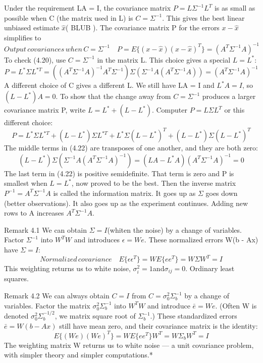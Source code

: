 	Under the requirement LA = I, the covariance matrix $P=L\Sigma^{-1}L^T$ is as small as
	possible when C (the matrix used in L) is $C=\Sigma^{-1}$. This gives the best linear unbiased
	estimate $\hat{x}$( BLUB ). The covariance matrix P for the errors $x-\hat{x}$ simplifies to
	\begin{equation}
	Output\, covariances\, when\, C=\Sigma^{-1} \quad
	P=E\{(x-\hat{x})(x-\hat{x})^T\}=(A^T\Sigma^{-1}A)^{-1}
	\end{equation}
	To check (4.20), use $C=\Sigma^{-1}$ in the matrix L. This choice gives a special $L=L^*$:
	\begin{equation}
	P=L^*\Sigma L^{*T}=((A^T\Sigma^{-1}A)^{-1}A^T\Sigma^{-1})\Sigma(\Sigma^{-1}A(A^T\Sigma^{-1}A))=(A^T\Sigma^{-1}A)^{-1}
	\end{equation}
	A different choice of C gives a different L. We still have LA = I and $L^*A=I$, so $(L-L^*)A=0$.
	To show that the change away from $C=\Sigma^{-1}$ produces a larger covariance matrix P, write $L=L^*+(L-L^*)$. Computer $P=L\Sigma L^T$ or this different choice:
	\begin{equation}
	P=L^*\Sigma L^{*T} + (L-L^*)\Sigma L^{*T} + L^*\Sigma(L-L^*)^T + (L-L^*)\Sigma(L-L^*)^T
	\end{equation}
	The middle terms in (4.22) are transposes of one another, and they are both zero:
	\begin{equation}
	(L-L^*)\Sigma(\Sigma^{-1}A(A^T\Sigma^{-1}A)^{-1})=(LA-L^*A)(A^T\Sigma^{-1}A)^{-1}=0
	\end{equation}
	The last term in (4.22) is positive semidefinite. That term is zero and P is smallest when
	$L=L^*$, now proved to be the best. Then the inverse matrix $P^{-1}=A^T\Sigma^{-1}A$ is called the	information matrix. It goes up as $\Sigma$ goes down (better observations). It also goes up as the experiment continues. Adding new rows to A increases $A^T\Sigma^{-1}A$.
	
	Remark 4.1\; We can obtain $\Sigma=I$(whiten the noise) by a change of variables. Factor
	$\Sigma^{-1}$ into $W^TW$ and introduces $\epsilon=We$. These normalized errors W(b - Ax) have
	$\Sigma=I$:
	\begin{equation*}
	Normalized \,covariance \quad
	E\{\epsilon\epsilon^T\}=WE\{ee^T\}=W\Sigma W^T=I
	\end{equation*}
	This weighting returns us to white noise, $\sigma^2_i=1$and$\sigma_{ij}=0$. Ordinary least squares.
		
	Remark 4.2\; We can always obtain $C=I$ from $C=\sigma^2_0\Sigma^{-1}_b$ by a change of variables.
	Factor the matrix $\sigma^2_0\Sigma^{-1}_b$ into $W^TW$ and introduce $\bar{e}=We$. (Often W is denoted $\sigma^2_0\Sigma^{-1/2}_b$, we matrix square root of $\Sigma^{-1}_b$.) These standardized errors $\bar{e}=W(b-Ax)$ still have mean zero, and their covariance matrix is the identity:
	\begin{equation*}
	E\{(We)(We)^T\}=WE\{ee^T\}W^T=W\Sigma_bW^T=I
	\end{equation*}
	The weighting matrix W returns us to white noise — a unit covariance problem, with simpler theory and simpler computations.*
	
